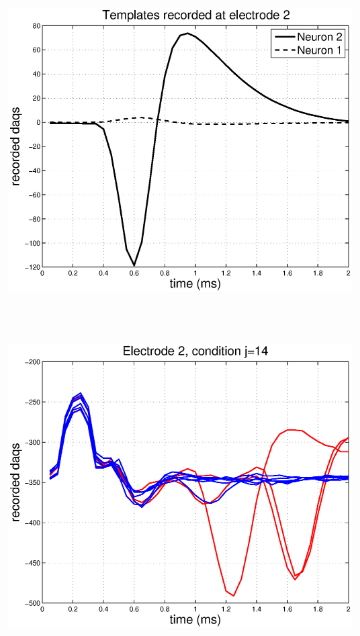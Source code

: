 \documentclass[12pt,letterpaper,fleqn]{article}
\begin{document}
\begin{figure}[ht!]
\begin{subfigure}[b]{0.23\textwidth}
                \includegraphics[width=\textwidth]{TemplateEL2.eps}
                \caption{}
        \end{subfigure}     
       ~ \begin{subfigure}[b]{0.23\textwidth}
                \includegraphics[width=\textwidth]{EL21.eps}
                \caption{}
        \end{subfigure}
       ~ \begin{subfigure}[b]{0.23\textwidth}

\end{subfigure}
\end{figure}
\end{document}
